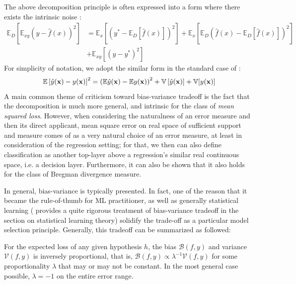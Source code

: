 \documentclass[10pt,oneside,oldfontcommands,dvipsnames,article]{memoir}
\begin{document}
The above decomposition principle is often expressed into a form where there exists the intrinsic noise \cite{brown2024biasvariance}: 
\begin{equation}
    \begin{split}
        \mathbb{E}_D \left[ \mathbb{E}_{xy} \left( y - \hat{f}(x) \right)^2 \right]
        &= 
         \mathbb{E}_x \left[ \left( y^* - \mathbb{E}_D[\hat{f}(x)] \right)^2 \right]
        + \mathbb{E}_x \left[ \mathbb{E}_D \left( \hat{f}(x) - \mathbb{E}_D[\hat{f}(x)] \right)^2 \right] \\
        &+ \mathbb{E}_{xy} \left[ \left( y - y^* \right)^2 \right]
    \end{split}
    \end{equation}
For simplicity of notation, we adopt the similar form in the standard case of \cite{adlam2020understandingdoubledescentrequires}: 
\begin{equation}
    \mathbb{E} \left[{\hat{y}(\mathbf{x})-y(\mathbf{x})}\right]^2 = \left({\mathbb{E}\hat{y}(\mathbf{x}) - \mathbb{E} y(\mathbf{x})}\right)^2 + \mathbb{V}\left[{\hat{y}(\mathbf{x})}\right] + \mathbb{V}[{y(\mathbf{x})}]
\end{equation}
A main common theme of criticism toward bias-variance tradeoff is the fact that the decomposition is much more general, and intrinsic for the class of \textit{mean squared loss}. However, when considering the naturalness of an error measure and then its direct applicant, mean square error on real space of sufficient support and measure comes of as a very natural choice of an error measure, at least in consideration of the regression setting; for that, we then can also define classification as another top-layer above a regression's similar real continuous space, i.e. a decision layer. Furthermore, it can also be shown \cite{brown2024biasvariance,PfauBregmanDivergence} that it also holds for the class of Bregman divergence measure. 

In general, bias-variance is typically presented. In fact, one of the reason that it became the rule-of-thumb for ML practitioner, as well as generally statistical learning (\cite{lafon_understanding_2024} provides a quite rigorous treatment of bias-variance tradeoff in the section on statistical learning theory) solidify the trade-off as a particular model selection principle. Generally, this tradeoff can be summarized as followed: 
\begin{theorem}
    For the expected loss of any given hypothesis $h$, the bias $\mathcal{B}(f,y)$ and variance $\mathcal{V}(f,y)$ is inversely proportional, that is, $\mathcal{B}(f,y)\propto \lambda^{-1} \mathcal{V}(f,y)$ for some proportionality $\lambda$ that may or may not be constant. In the most general case possible, $\lambda = -1$ on the entire error range. 
\end{theorem}
\end{document}
